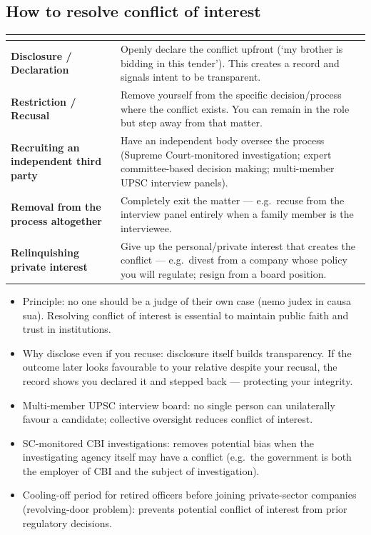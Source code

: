 \subsection*{How to resolve conflict of interest}

\begin{tabularx}{\textwidth}{@{}>{\bfseries\color{Accent}}p{4.1cm} Y@{}}
\toprule
{} &  \\
\midrule
Disclosure / Declaration & Openly declare the conflict upfront (`my brother is bidding in this tender'). This creates a record and signals intent to be transparent. \\
Restriction / Recusal & Remove yourself from the specific decision/process where the conflict exists. You can remain in the role but step away from that matter. \\
Recruiting an independent third party & Have an independent body oversee the process (Supreme Court-monitored investigation; expert committee-based decision making; multi-member UPSC interview panels). \\
Removal from the process altogether & Completely exit the matter --- e.g.\ recuse from the interview panel entirely when a family member is the interviewee. \\
Relinquishing private interest & Give up the personal/private interest that creates the conflict --- e.g.\ divest from a company whose policy you will regulate; resign from a board position. \\
\bottomrule
\end{tabularx}

\begin{CriticalPoint}
\begin{itemize}
\item Principle: no one should be a judge of their own case (nemo judex in causa sua). Resolving conflict of interest is essential to maintain public faith and trust in institutions.
\item Why disclose even if you recuse: disclosure itself builds transparency. If the outcome later looks favourable to your relative despite your recusal, the record shows you declared it and stepped back --- protecting your integrity.
\end{itemize}
\end{CriticalPoint}

\begin{GovtPolicy}
\begin{itemize}
\item Multi-member UPSC interview board: no single person can unilaterally favour a candidate; collective oversight reduces conflict of interest.
\item SC-monitored CBI investigations: removes potential bias when the investigating agency itself may have a conflict (e.g.\ the government is both the employer of CBI and the subject of investigation).
\item Cooling-off period for retired officers before joining private-sector companies (revolving-door problem): prevents potential conflict of interest from prior regulatory decisions.
\end{itemize}
\end{GovtPolicy}

